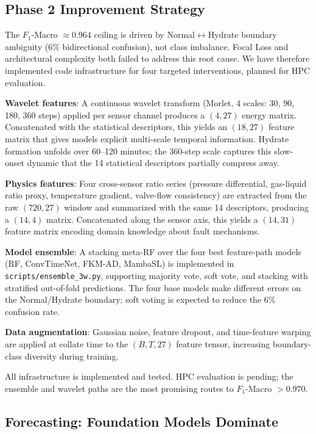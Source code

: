 \documentclass[conference]{IEEEtran}
\begin{document}
\subsection{Phase 2 Improvement Strategy}

The $F_1$-Macro $\approx 0.964$ ceiling is driven by Normal$\leftrightarrow$Hydrate boundary ambiguity (6\% bidirectional confusion), not class imbalance. Focal Loss and architectural complexity both failed to address this root cause. We have therefore implemented code infrastructure for four targeted interventions, planned for HPC evaluation.

\textbf{Wavelet features}: A continuous wavelet transform (Morlet, 4 scales: 30, 90, 180, 360 steps) applied per sensor channel produces a $(4, 27)$ energy matrix. Concatenated with the statistical descriptors, this yields an $(18, 27)$ feature matrix that gives models explicit multi-scale temporal information. Hydrate formation unfolds over 60--120 minutes; the 360-step scale captures this slow-onset dynamic that the 14 statistical descriptors partially compress away.

\textbf{Physics features}: Four cross-sensor ratio series (pressure differential, gas-liquid ratio proxy, temperature gradient, valve-flow consistency) are extracted from the raw $(720, 27)$ window and summarized with the same 14 descriptors, producing a $(14, 4)$ matrix. Concatenated along the sensor axis, this yields a $(14, 31)$ feature matrix encoding domain knowledge about fault mechanisms.

\textbf{Model ensemble}: A stacking meta-RF over the four best feature-path models (RF, ConvTimeNet, FKM-AD, MambaSL) is implemented in \texttt{scripts/ensemble\_3w.py}, supporting majority vote, soft vote, and stacking with stratified out-of-fold predictions. The four base models make different errors on the Normal/Hydrate boundary; soft voting is expected to reduce the 6\% confusion rate.

\textbf{Data augmentation}: Gaussian noise, feature dropout, and time-feature warping are applied at collate time to the $(B, T, 27)$ feature tensor, increasing boundary-class diversity during training.

All infrastructure is implemented and tested. HPC evaluation is pending; the ensemble and wavelet paths are the most promising routes to $F_1$-Macro $> 0.970$.

\subsection{Forecasting: Foundation Models Dominate}
\end{document}
